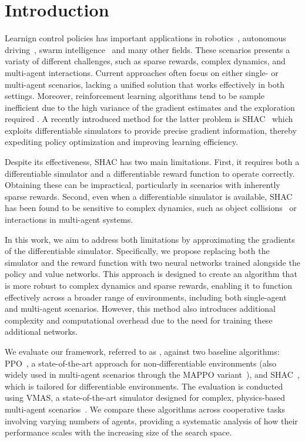 \section{Introduction}\label{sect:introduction}

Learnign control policies has important applications in robotics~\cite{Singh22}, autonomous driving~\cite{Elallid22}, swarm intelligence~\cite{Tang21} and many other fields. These scenarios presents a variaty of different challenges, such as sparse rewards, complex dynamics, and multi-agent interactions. Current approaches often focus on either single- or multi-agent scenarios, lacking a unified solution that works effectively in both settings. Moreover, reinforcement learning algorithms tend to be sample inefficient due to the high variance of the gradient estimates and the exploration required \texttt{\color{DarkOrchid}{<- FB: non mi è super chiara questa frase}}. A recently introduced method for the latter problem is SHAC~\cite{Xu22} which exploits differentiable simulators to provide precise gradient information, thereby expediting policy optimization and improving learning efficiency.

Despite its effectiveness, SHAC has two main limitations. First, it requires both a differentiable simulator and a differentiable reward function to operate correctly. Obtaining these can be impractical, particularly in scenarios with inherently sparse rewards. Second, even when a differentiable simulator is available, SHAC has been found to be sensitive to complex dynamics, such as object collisions~\cite{Georgiev24} or interactions in multi-agent systems.

In this work, we aim to address both limitations by approximating the gradients of the differentiable simulator. Specifically, we propose replacing both the simulator and the reward function with two neural networks trained alongside the policy and value networks. This approach is designed to create an algorithm that is more robust to complex dynamics and sparse rewards, enabling it to function effectively across a broader range of environments, including both single-agent and multi-agent scenarios. However, this method also introduces additional complexity and computational overhead due to the need for training these additional networks.

We evaluate our framework, referred to as \fname{}, against two baseline algorithms: PPO~\cite{Schulman17}, a state-of-the-art approach for non-differentiable environments (also widely used in multi-agent scenarios through the MAPPO variant~\cite{DBLP:conf/nips/YuVVGWBW22}), and SHAC~\cite{Xu22}, which is tailored for differentiable environments. The evaluation is conducted using VMAS, a state-of-the-art simulator designed for complex, physics-based multi-agent scenarios~\cite{DBLP:conf/dars/BettiniKBP22}. We compare these algorithms across cooperative tasks involving varying numbers of agents, providing a systematic analysis of how their performance scales with the increasing size of the search space.

